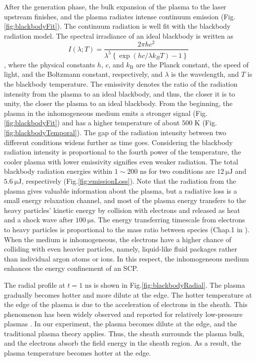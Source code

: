 After the generation phase, the bulk expansion of the plasma to the laser upstream finishes, and the plasma radiates intense continuum emission (Fig.\ref{fig:blackbodyFit}). The continuum radiation is well fit with the blackbody radiation model. The spectral irradiance of an ideal blackbody is written as
\begin{equation}
I \left( \lambda ; T \right) = \frac{2 \pi h c^{2}}{\lambda^{5}\left\{\exp \left(h c / \lambda k_{B} T\right)-1\right\}}
\end{equation}
, where the physical constants $h$, $c$, and $k_\text{B}$ are the Planck constant, the speed of light, and the Boltzmann constant, respectively, and $\lambda$ is the wavelength, and $T$ is the blackbody temperature. The emissivity denotes the ratio of the radiation intensity from the plasma to an ideal blackbody, and thus, the closer it is to unity, the closer the plasma to an ideal blackbody. From the beginning, the plasma in the inhomogeneous medium emits a stronger signal (Fig.\ref{fig:blackbodyFit}) and has a higher temperature of about $500 \text{ K}$ (Fig.\ref{fig:blackbodyTemporal}). The gap of the radiation intensity between two different conditions widens further as time goes. Considering the blackbody radiation intensity is proportional to the fourth power of the temperature, the cooler plasma with lower emissivity signifies even weaker radiation. The total blackbody radiation energies within $1 \sim 200 \text{ ns}$ for two conditions are $12 ~\mathrm{\mu} \text{J}$ and $5.6 ~\mathrm{\mu} \text{J}$, respectively (Fig.\ref{fig:emissionLoss}). Note that the radiation from the plasma gives valuable information about the plasma, but a radiative loss is a small energy relaxation channel, and most of the plasma energy transfers to the heavy particles’ kinetic energy by collision with electrons and released as heat and a shock wave after $100 ~\mathrm{\mu} \text{s}$. The energy transferring timescale from electrons to heavy particles is proportional to the mass ratio between species (Chap.1 in \cite{bellan2008fundamentals}). When the medium is inhomogeneous, the electrons have a higher chance of colliding with even heavier particles, namely, liquid-like fluid packages rather than individual argon atoms or ions. In this respect, the inhomogeneous medium enhances the energy confinement of an SCP.

The radial profile at $t=1 \text{ ns}$ is shown in Fig.\ref{fig:blackbodyRadial}. The plasma gradually becomes hotter and more dilute at the edge. The hotter temperature at the edge of the plasma is due to the acceleration of electrons in the sheath. This phenomenon has been widely observed and reported for relatively low-pressure plasmas \cite{van2012laser}. In our experiment, the plasma becomes dilute at the edge, and the traditional plasma theory applies. Thus, the sheath surrounds the plasma bulk, and the electrons absorb the field energy in the sheath region. As a result, the plasma temperature becomes hotter at the edge.

